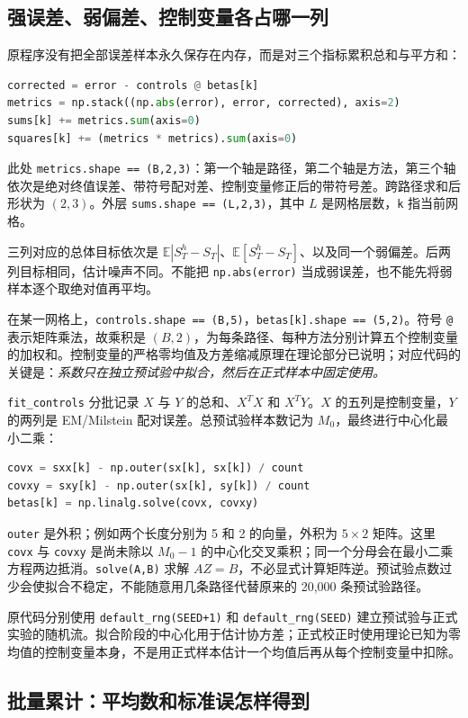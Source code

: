 \documentclass[11pt,a4paper,fontset=none]{ctexart}
\numberwithin{equation}{section}
\newcommand{\E}{\mathbb E}
\begin{document}
\subsection{强误差、弱偏差、控制变量各占哪一列}

原程序没有把全部误差样本永久保存在内存，而是对三个指标累积总和与平方和：
\begin{lstlisting}[language=Python]
corrected = error - controls @ betas[k]
metrics = np.stack((np.abs(error), error, corrected), axis=2)
sums[k] += metrics.sum(axis=0)
squares[k] += (metrics * metrics).sum(axis=0)
\end{lstlisting}
此处 \texttt{metrics.shape == (B,2,3)}：第一个轴是路径，第二个轴是方法，第三个轴依次是绝对终值误差、带符号配对差、控制变量修正后的带符号差。跨路径求和后形状为 $(2,3)$。外层 \texttt{sums.shape == (L,2,3)}，其中 $L$ 是网格层数，\texttt{k} 指当前网格。

三列对应的总体目标依次是 $\E|S_T^h-S_T|$、$\E[S_T^h-S_T]$、以及同一个弱偏差。后两列目标相同，估计噪声不同。不能把 \texttt{np.abs(error)} 当成弱误差，也不能先将弱样本逐个取绝对值再平均。

在某一网格上，\texttt{controls.shape == (B,5)}，\texttt{betas[k].shape == (5,2)}。符号 \texttt{@} 表示矩阵乘法，故乘积是 $(B,2)$，为每条路径、每种方法分别计算五个控制变量的加权和。控制变量的严格零均值及方差缩减原理在理论部分已说明；对应代码的关键是：\emph{系数只在独立预试验中拟合，然后在正式样本中固定使用。}

\texttt{fit\_controls} 分批记录 $X$ 与 $Y$ 的总和、$X^TX$ 和 $X^TY$。$X$ 的五列是控制变量，$Y$ 的两列是 EM/Milstein 配对误差。总预试验样本数记为 $M_0$，最终进行中心化最小二乘：
\begin{lstlisting}[language=Python]
covx = sxx[k] - np.outer(sx[k], sx[k]) / count
covxy = sxy[k] - np.outer(sx[k], sy[k]) / count
betas[k] = np.linalg.solve(covx, covxy)
\end{lstlisting}
\texttt{outer} 是外积；例如两个长度分别为 5 和 2 的向量，外积为 $5\times2$ 矩阵。这里 \texttt{covx} 与 \texttt{covxy} 是尚未除以 $M_0-1$ 的中心化交叉乘积；同一个分母会在最小二乘方程两边抵消。\texttt{solve(A,B)} 求解 $AZ=B$，不必显式计算矩阵逆。预试验点数过少会使拟合不稳定，不能随意用几条路径代替原来的 20,000 条预试验路径。

原代码分别使用 \texttt{default\_rng(SEED+1)} 和 \texttt{default\_rng(SEED)} 建立预试验与正式实验的随机流。拟合阶段的中心化用于估计协方差；正式校正时使用理论已知为零均值的控制变量本身，不是用正式样本估计一个均值后再从每个控制变量中扣除。

\subsection{批量累计：平均数和标准误怎样得到}
\end{document}
